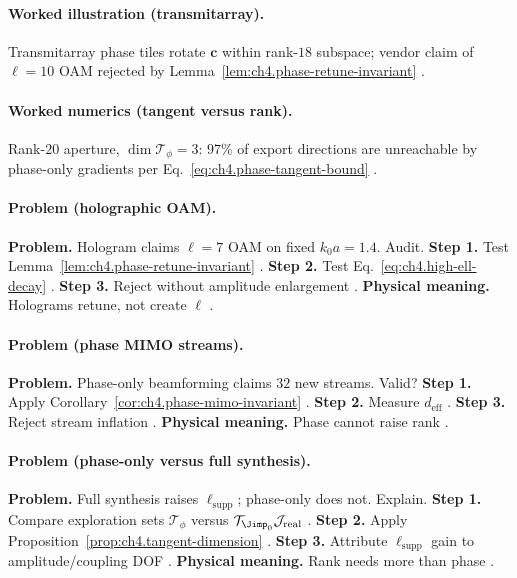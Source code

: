 \paragraph{Worked illustration (transmitarray).}
Transmitarray phase tiles rotate \(\mathbf{c}\) within rank-\(18\) subspace; vendor claim of \(\ell=10\) OAM rejected by Lemma~\ref{lem:ch4.phase-retune-invariant}
\cite{hansen1988,jackson1999,stratton1941,devaney2004}.

\paragraph{Worked numerics (tangent versus rank).}
Rank-\(20\) aperture, \(\dim\mathcal{T}_{\phi}=3\): \(97\%\) of export directions are unreachable by phase-only gradients per
Eq.~\eqref{eq:ch4.phase-tangent-bound} \cite{harrington2001,stratton1941,hansen1988,devaney2004,collin2001}.

\paragraph{Problem (holographic OAM).}
\textbf{Problem.} Hologram claims \(\ell=7\) OAM on fixed \(k_{0}a=1.4\). Audit.
\textbf{Step 1.} Test Lemma~\ref{lem:ch4.phase-retune-invariant} \cite{hansen1988,harrington2001}.
\textbf{Step 2.} Test Eq.~\eqref{eq:ch4.high-ell-decay} \cite{jackson1999,devaney2004}.
\textbf{Step 3.} Reject without amplitude enlargement \cite{stratton1941,collin2001}.
\textbf{Physical meaning.} Holograms retune, not create \(\ell\) \cite{harrington2001}.

\paragraph{Problem (phase MIMO streams).}
\textbf{Problem.} Phase-only beamforming claims \(32\) new streams. Valid?
\textbf{Step 1.} Apply Corollary~\ref{cor:ch4.phase-mimo-invariant} \cite{harrington2001,devaney2004}.
\textbf{Step 2.} Measure \(d_{\mathrm{eff}}\) \cite{hansen1988,stratton1941}.
\textbf{Step 3.} Reject stream inflation \cite{jackson1999,collin2001}.
\textbf{Physical meaning.} Phase cannot raise rank \cite{stratton1941}.

\paragraph{Problem (phase-only versus full synthesis).}
\textbf{Problem.} Full synthesis raises \(\ell_{\mathrm{supp}}\); phase-only does not. Explain.
\textbf{Step 1.} Compare exploration sets \(\mathcal{T}_{\phi}\) versus \(\mathcal{T}_{\Jimp_{0}}\mathcal{J}_{\mathrm{real}}\) \cite{harrington2001,stratton1941}.
\textbf{Step 2.} Apply Proposition~\ref{prop:ch4.tangent-dimension} \cite{devaney2004,hansen1988}.
\textbf{Step 3.} Attribute \(\ell_{\mathrm{supp}}\) gain to amplitude/coupling DOF \cite{jackson1999}.
\textbf{Physical meaning.} Rank needs more than phase \cite{stratton1941,collin2001}.

